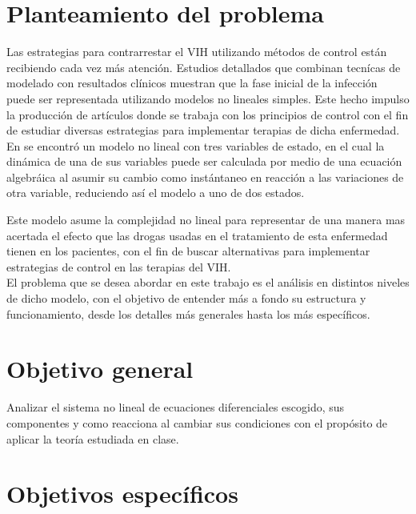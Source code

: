 \documentclass{article}
\begin{document}


\section{Planteamiento del problema}

Las estrategias para contrarrestar el VIH utilizando métodos de control están
recibiendo cada vez más atención. Estudios detallados que combinan
tecnícas de modelado con resultados clínicos muestran que la fase inicial de la
infección puede ser representada utilizando modelos no lineales simples.\cite{paper}
Este hecho impulso la producción de artículos donde se trabaja con los principios
de control con el fin de estudiar diversas estrategias para implementar terapias de dicha
enfermedad.\\

En \cite{model} se encontró un modelo no lineal con tres variables de estado, en el
cual la dinámica de una de sus variables puede ser calculada por medio de una
ecuación algebráica al asumir su cambio como instántaneo en reacción a las variaciones
de otra variable, reduciendo así el modelo a uno de dos estados.

Este modelo asume la complejidad no lineal para representar de una manera 
mas acertada el efecto que las drogas usadas en el tratamiento de esta
enfermedad tienen en los pacientes, con el fin de buscar alternativas para
implementar estrategias de control en las terapias del VIH.\\

El problema que se desea abordar en este trabajo es el análisis en distintos niveles
de dicho modelo, con el objetivo de entender más a fondo su estructura y
funcionamiento, desde los detalles más generales hasta los más específicos.

\section{Objetivo general}

Analizar el sistema no lineal de ecuaciones diferenciales escogido, sus componentes y
como reacciona al cambiar sus condiciones con el propósito de aplicar la teoría
estudiada en clase.

\section{Objetivos específicos}
\end{document}
